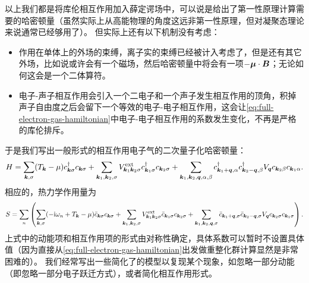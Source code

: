 以上我们都是将库伦相互作用加入薛定谔场中，可以说是给出了第一性原理计算需要的哈密顿量（虽然实际上从高能物理的角度这远非第一性原理，但对凝聚态理论来说通常已经够用了）。
但实际上还有以下机制没有考虑：
\begin{itemize}
    \item 作用在单体上的外场的束缚，离子实的束缚已经被计入考虑了，但是还有其它外场，比如说或许会有一个磁场，然后哈密顿量中将会有一项$-\vb*{\mu} \cdot \vb*{B}$；无论如何这会是一个二体算符。
    \item 电子-声子相互作用会引入一个二电子和一个声子发生相互作用的顶角，积掉声子自由度之后会留下一个等效的电子-电子相互作用，这会让\eqref{eq:full-electron-gas-hamiltonian}中电子-电子相互作用的系数发生变化，不再是严格的库伦排斥。
\end{itemize}
于是我们写出一般形式的相互作用电子气的二次量子化哈密顿量：
\begin{equation}
    {H} = \sum_{\vb*{k}, \sigma} (T_{\vb*{k}} - \mu) {c}^\dagger_{\vb*{k} \sigma} {c}_{\vb*{k} \sigma} 
    + \sum_{\vb*{k}_1, \vb*{k}_2, \sigma} V^\text{ext}_{\vb*{k}_1 \vb*{k}_2 \sigma} {c}^\dagger_{\vb*{k}_1 \sigma} {c}_{\vb*{k}_2 \sigma}
    + \sum_{\vb*{k}_1, \vb*{k}_2, \vb*{q}, \alpha, \beta} {c}^\dagger_{\vb*{k}_1+\vb*{q}, \alpha} {c}^\dagger_{\vb*{k}_2-\vb*{q}, \beta} V_{\vb*{q}} {c}_{\vb*{k}_2 \beta} {c}_{\vb*{k}_1 \alpha}. 
\end{equation}
相应的，热力学作用量为
\begin{equation}
    S = \sum_n \left( 
        \sum_{\vb*{k}, \sigma} (-\mathrm{i} \omega_n + T_{\vb*{k}} - \mu) \bar{c}_{\vb*{k} \sigma} c_{\vb*{k} \sigma} 
        + \sum_{\vb*{k}_1, \vb*{k}_2, \sigma} V^\text{ext}_{\vb*{k}_1 \vb*{k}_2 \sigma} \bar{c}_{\vb*{k}_1 \sigma} c_{\vb*{k}_2 \sigma} 
        + \sum_{\vb*{k}_1, \vb*{k}_2, \vb*{q}, \sigma} \bar{c}_{\vb*{k}_1+\vb*{q}, \sigma} \bar{c}_{\vb*{k}_2-\vb*{q}, \sigma} V_{\vb*{q}} c_{\vb*{k}_2 \sigma} c_{\vb*{k}_1 \sigma} \right). 
\end{equation}
上式中的动能项和相互作用项的形式由对称性确定，具体系数可以暂时不设置具体值（因为直接从\eqref{eq:full-electron-gas-hamiltonian}出发做重整化群计算显然是非常困难的）。
我们经常写出一些简化了的模型以复现某个现象，如忽略一部分动能（即忽略一部分电子跃迁方式），或者简化相互作用形式。


